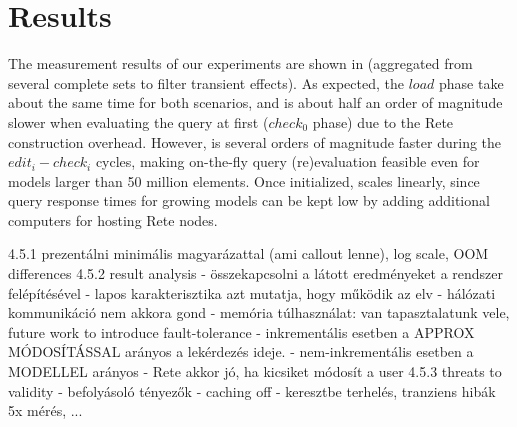 \section{Results}
\label{benchmark-results}\label{analysis}

The measurement results of our experiments are shown in  (aggregated from several complete sets to filter transient effects). As expected, the $\mathit{load}$ phase take about the same time for both scenarios, and \iqd{} is about half an order of magnitude slower when evaluating the query at first ($\mathit{check}_0$ phase) due to the Rete construction overhead. However, \iqd{} is several orders of magnitude faster during the $\mathit{edit}_i-\mathit{check}_i$ cycles, making on-the-fly query (re)evaluation feasible even for models larger than 50 million elements. Once initialized, \iqd{} scales linearly, since query response times for growing models can be kept low by adding additional computers for hosting Rete nodes.


4.5.1 prezentálni minimális magyarázattal (ami callout lenne), log scale, OOM differences
4.5.2 result analysis
  - összekapcsolni a látott eredményeket a rendszer felépítésével
  - lapos karakterisztika azt mutatja, hogy működik az elv
  - hálózati kommunikáció nem akkora gond
  - memória túlhasználat: van tapasztalatunk vele, future work to introduce fault-tolerance
  - inkrementális esetben a APPROX MÓDOSÍTÁSSAL arányos a lekérdezés ideje.
  - nem-inkrementális esetben a MODELLEL arányos
  - Rete akkor jó, ha kicsiket módosít a user
4.5.3 threats to validity
  - befolyásoló tényezők
    - caching off
    - keresztbe terhelés, tranziens hibák 5x mérés, ...















